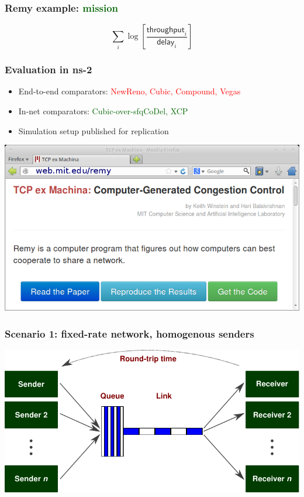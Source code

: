\documentclass[svgnames]{beamer}
\begin{document}
\begin{frame}
\frametitle{Remy example: \textbf{\textcolor{DarkGreen}{mission}}}

\LARGE

\[\sum_i \log \left[ \frac{\textsf{throughput}_i}{\textsf{delay}_i} \right]\]

\end{frame}



\begin{frame}
\frametitle{Evaluation in ns-2}

\begin{itemize}

\item End-to-end comparators: \textcolor{Red}{NewReno, Cubic, Compound, Vegas}

\item In-net comparators: \textcolor{DarkGreen}{Cubic-over-sfqCoDel, XCP}

\item Simulation setup published for replication

\end{itemize}

\begin{centering}
\includegraphics[width=9 cm]{reproducethis.png}

\end{centering}

\end{frame}

\begin{frame}
\frametitle{Scenario 1: fixed-rate network, homogenous senders}

\includegraphics[width=\textwidth]{dumbbell.pdf}

\end{frame}
\end{document}
